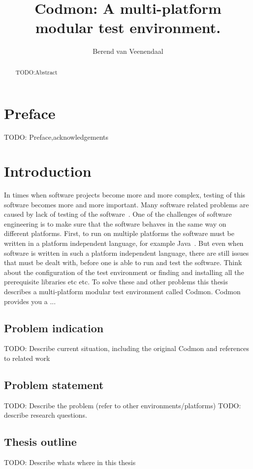 \documentclass[a4paper,10pt]{scrartcl}
\title{Codmon: A multi-platform modular test environment.}
\author{Berend van Veenendaal}
\newcommand{\newCommandName}{Codmon}
\begin{document}
\maketitle

\begin{abstract}
TODO:Abstract
\end{abstract}
\newpage
\section*{Preface}
\label{sec:Preface}
TODO: Preface,acknowledgements
\newpage
\tableofcontents
\newpage

\section{Introduction}
\label{sec:Introduction}
In times when software projects become more and more complex, testing of this software becomes more and more important. Many software
related problems are caused by lack of testing of the software~\cite{TTCST}. One of the challenges of software engineering is to make
sure that the software behaves in the same way on different platforms. First, to run on multiple platforms the software must be written in a
platform independent language, for example Java~\cite{Java}. But even when software is written in such a platform independent language, there 
are still issues that must be dealt with, before one is able to run and test the software. Think about the configuration of the test environment 
or finding and installing all the prerequisite libraries etc etc. To solve these and other problems this thesis describes a multi-platform modular
test environment called \newCommandName{}. \newCommandName{} provides you a ...

\subsection{Problem indication}
\label{subsec:Problemindication}
TODO: Describe current situation, including the original Codmon and references to related work

\subsection{Problem statement}
\label{subsec:Problemstatement}
TODO: Describe the problem (refer to other environments/platforms)
TODO: describe research questions.

\subsection{Thesis outline}
\label{subsec:Thesisoutline}
TODO: Describe whats where in this thesis
\end{document}
